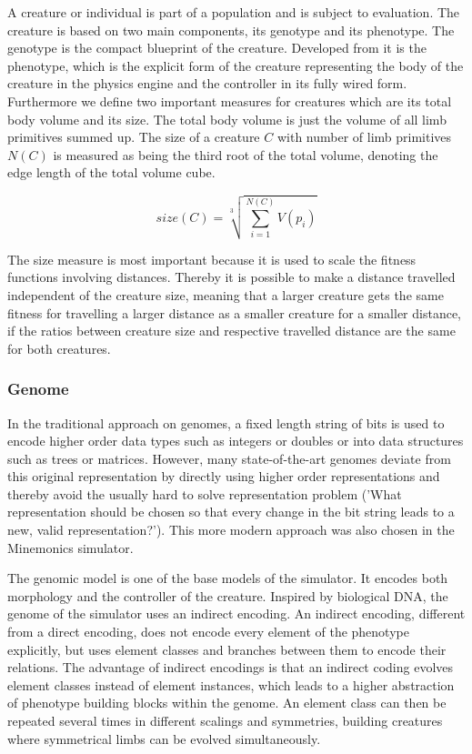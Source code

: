 \documentclass[main]{subfiles}
\begin{document}
A creature or individual is part of a population and is subject to evaluation. The creature is based on two main components, its genotype and its phenotype. The genotype is the compact blueprint of the creature. Developed from it is the phenotype, which is the explicit form of the creature representing the body of the creature in the physics engine and the controller in its fully wired form. Furthermore we define two important measures for creatures which are its total body volume and its size. The total body volume is just the volume of all limb primitives summed up. The size of a creature \(C\) with number of limb primitives \(N(C)\) is measured as being the third root of the total volume, denoting the edge length of the total volume cube. 

\[size(C) = \sqrt[3]{\sum\limits^{N(C)}_{i=1} V(p_i)}\]

The size measure is most important because it is used to scale the fitness functions involving distances. Thereby it is possible to make a distance travelled independent of the creature size, meaning that a larger creature gets the same fitness for travelling a larger distance as a smaller creature for a smaller distance, if the ratios between creature size and respective travelled distance are the same for both creatures.

\subsubsection{Genome}

In the traditional approach on genomes, a fixed length string of bits is used to encode higher order data types such as integers or doubles or into data structures such as trees or matrices. However, many state-of-the-art genomes deviate from this original representation by directly using higher order representations and thereby avoid the usually hard to solve representation problem ('What representation should be chosen so that every change in the bit string leads to a new, valid representation?'). This more modern approach was also chosen in the Minemonics simulator.

The genomic model is one of the base models of the simulator. It encodes both morphology and the controller of the creature. Inspired by biological DNA, the genome of the simulator uses an indirect encoding. An indirect encoding, different from a direct encoding, does not encode every element of the phenotype explicitly, but uses element classes and branches between them to encode their relations. The advantage of indirect encodings is that an indirect coding evolves element classes instead of element instances, which leads to a higher abstraction of phenotype building blocks within the genome. An element class can then be repeated several times in different scalings and symmetries, building creatures where symmetrical limbs can be evolved simultaneously.
\end{document}
